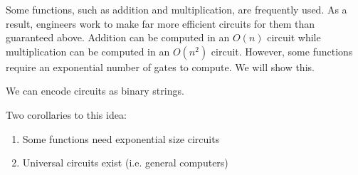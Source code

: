 \hr

Some functions, such as addition and multiplication, are frequently used. As a result, engineers work to make far more efficient circuits for them than guaranteed above. Addition can be computed in an $O(n)$ circuit while multiplication can be computed in an $O(n^2)$ circuit. However, some functions require an exponential number of gates to compute. We will show this.

\vspace{.5cm}

 We can encode circuits as binary strings. 

Two corollaries to this idea: 
\begin{enumerate}
    \item Some functions need exponential size circuits
    \item Universal circuits exist (i.e. general computers)
\end{enumerate}

